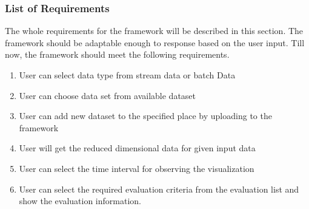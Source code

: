 \subsubsection{List of Requirements }
The whole requirements for the framework will be described in this section. The framework should be adaptable enough to response based on the user input. Till now, the framework should meet the following requirements. 
\begin{enumerate}
	\item User can select data type from stream data or batch Data
	\item User can choose data set from available dataset
	\item User can add new dataset to the specified place by uploading to the framework
	\item User will get the reduced dimensional data for given input data
	\item User can select the time interval for observing the visualization
	\item User can select the required evaluation criteria from the evaluation list and show the evaluation information.
\end{enumerate}
